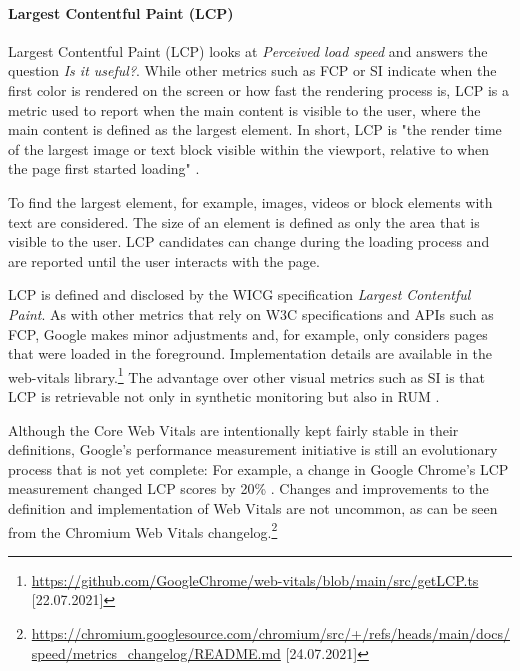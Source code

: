
\paragraph{Largest Contentful Paint (LCP)} %


Largest Contentful Paint (LCP) looks at \textit{Perceived load speed} and answers the question \textit{Is it useful?}.
While other metrics such as FCP or SI indicate when the first color is rendered on the screen or how fast the rendering process is, LCP is a metric used to report when the main content is visible to the user, where the main content is defined as the largest element.
In short, LCP is "the render time of the largest image or text block visible within the viewport, relative to when the page first started loading" \cite{2020WaltonLCP}.

To find the largest element, for example, images, videos or block elements with text are considered.
The size of an element is defined as only the area that is visible to the user.
LCP candidates can change during the loading process and are reported until the user interacts with the page.

LCP is defined and disclosed by the WICG specification \textit{Largest Contentful Paint}.
As with other metrics that rely on W3C specifications and APIs such as FCP, Google makes minor adjustments and, for example, only considers pages that were loaded in the foreground.
Implementation details are available in the web-vitals library.\footnote{\url{https://github.com/GoogleChrome/web-vitals/blob/main/src/getLCP.ts} [22.07.2021]}
The advantage over other visual metrics such as SI is that LCP is retrievable not only in synthetic monitoring but also in RUM \cite{2020WaltonLCP}.


Although the Core Web Vitals are intentionally kept fairly stable in their definitions, Google's performance measurement initiative is still an evolutionary process that is not yet complete:
For example, a change in Google Chrome's LCP measurement changed LCP scores by 20\% \cite{2021Gessert}.
Changes and improvements to the definition and implementation of Web Vitals are not uncommon, as can be seen from the Chromium Web Vitals changelog.\footnote{\url{https://chromium.googlesource.com/chromium/src/+/refs/heads/main/docs/speed/metrics_changelog/README.md} [24.07.2021]}


